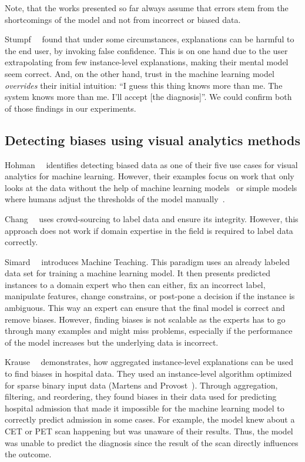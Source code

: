 Note, that the works presented so far always assume that errors stem from the shortcomings of the model and not from incorrect or biased data.

Stumpf~\etal~\cite{harmful} found that under some circumstances, explanations can be harmful to the end user, by invoking false confidence.
This is on one hand due to the user extrapolating from few instance-level explanations, making their mental model seem correct.
And, on the other hand, trust in the machine learning model \emph{overrides} their initial intuition: ``I guess this thing knows more than me. The system knows more than me. I'll accept [the diagnosis]''.
We could confirm both of those findings in our experiments.

\subsection{Detecting biases using visual analytics methods}
Hohman~\etal~\cite{2018arXiv180106889H} identifies detecting biased data as one of their five use cases for visual analytics for machine learning.
However, their examples focus on work that only looks at the data without the help of machine learning models~\cite{facets} or simple models where humans adjust the thresholds of the model manually~\cite{wattenberg}.

Chang~\etal~\cite{revolt-collaborative-crowdsourcing-labeling-machine-learning-datasets} uses crowd-sourcing to label data and ensure its integrity.
However, this approach does not work if domain expertise in the field is required to label data correctly.

Simard~\etal~\cite{DBLP:journals/corr/SimardACPGMRSVW17} introduces Machine Teaching.
This paradigm uses an already labeled data set for training a machine learning model.
It then presents predicted instances to a domain expert who then can either, fix an incorrect label, manipulate features, change constrains, or post-pone a decision if the instance is ambiguous.
This way an expert can ensure that the final model is correct and remove biases.
However, finding biases is not scalable as the experts has to go through many examples and might miss problems, especially if the performance of the model increases but the underlying data is incorrect.

Krause~\etal~\cite{explainer} demonstrates, how aggregated instance-level explanations can be used to find biases in hospital data.
They used an instance-level algorithm optimized for sparse binary input data (Martens and Provost~\cite{Martens:2014:EDD:2600518.2600523}).
Through aggregation, filtering, and reordering, they found biases in their data used for predicting hospital admission that made it impossible for the machine learning model to correctly predict admission in some cases.
For example, the model knew about a CET or PET scan happening but was unaware of their results.
Thus, the model was unable to predict the diagnosis since the result of the scan directly influences the outcome.



